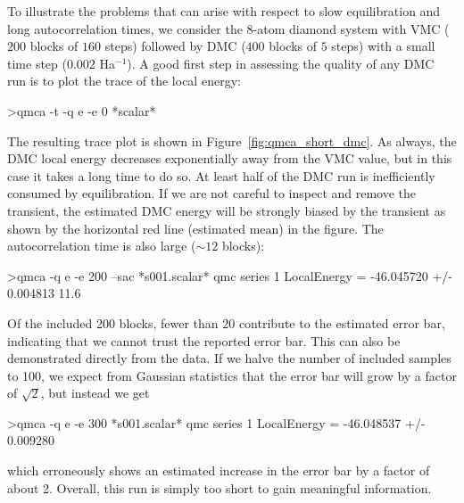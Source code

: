 To illustrate the problems that can arise with respect to slow 
equilibration and long autocorrelation times, we consider the 
8-atom diamond system with VMC ($200$ blocks of $160$ steps) followed 
by DMC ($400$ blocks of $5$ steps) with a small time step ($0.002$ Ha$^{-1}$).
A good first step in assessing the quality of any DMC run is 
to plot the trace of the local energy:
\begin{shade}
>qmca -t -q e -e 0 *scalar*
\end{shade}
\noindent
The resulting trace plot is shown in Figure~\ref{fig:qmca_short_dmc}.  
As always, the DMC local energy decreases exponentially away from 
the VMC value, but in this case it takes a long time to do so.  
At least half of the DMC run is inefficiently consumed by equilibration.
If we are not careful to inspect and remove the transient, the estimated 
DMC energy will be strongly biased by the transient as shown by the 
horizontal red line (estimated mean) in the figure.  The autocorrelation 
time is also large ($\sim 12$ blocks):
\begin{shade}
>qmca -q e -e 200 --sac *s001.scalar*
qmc  series 1  LocalEnergy           =  -46.045720 +/- 0.004813   11.6
\end{shade}
\noindent
Of the included 200 blocks, fewer than 20 contribute to the estimated error 
bar, indicating that we cannot trust the reported error bar.  
This can also be demonstrated directly from the data.  If we halve the number 
of included samples to 100, we expect from Gaussian statistics 
that the error bar will grow by a factor of $\sqrt{2}$, but instead we 
get
\begin{shade}
>qmca -q e -e 300 *s001.scalar*
qmc  series 1  LocalEnergy           =  -46.048537 +/- 0.009280
\end{shade}
\noindent
which erroneously shows an estimated increase in the error bar by a factor 
of about 2.  Overall, this run is simply too short to gain meaningful 
information.  

